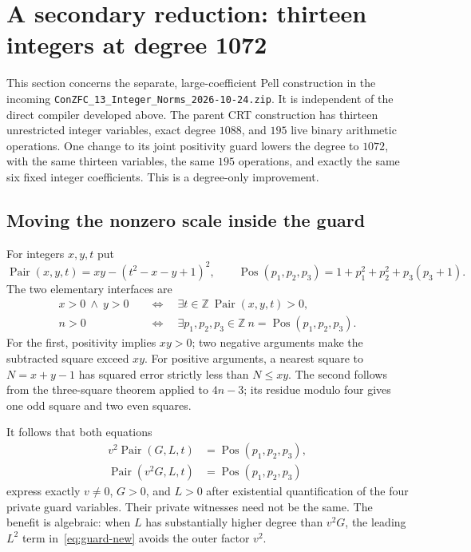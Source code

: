\section{A secondary reduction: thirteen integers at degree 1072}
\label{sec:guard-supplement}

This section concerns the separate, large-coefficient Pell construction in
the incoming \texttt{ConZFC\_13\_Integer\_Norms\_2026-10-24.zip}.
It is independent of the direct compiler developed above.
The parent CRT construction has thirteen unrestricted integer variables,
exact degree $1088$, and $195$ live binary arithmetic operations.
One change to its joint positivity guard lowers the degree to $1072$,
with the same thirteen variables, the same $195$ operations, and exactly
the same six fixed integer coefficients. This is a degree-only improvement.

\subsection{Moving the nonzero scale inside the guard}

For integers $x,y,t$ put
\[
 \operatorname{Pair}(x,y,t)=xy-(t^2-x-y+1)^2,
 \qquad
 \operatorname{Pos}(p_1,p_2,p_3)
 =1+p_1^2+p_2^2+p_3(p_3+1).
\]
The two elementary interfaces are
\begin{align*}
 x>0\ \land\ y>0
 &\quad\Longleftrightarrow\quad
 \exists t\in\mathbb Z\ \operatorname{Pair}(x,y,t)>0,\\
 n>0
 &\quad\Longleftrightarrow\quad
 \exists p_1,p_2,p_3\in\mathbb Z\
 n=\operatorname{Pos}(p_1,p_2,p_3).
\end{align*}
For the first, positivity implies $xy>0$; two negative arguments make the
subtracted square exceed $xy$. For positive arguments, a nearest square
to $N=x+y-1$ has squared error strictly less than $N\le xy$.
The second follows from the three-square theorem applied to $4n-3$;
its residue modulo four gives one odd square and two even squares.

It follows that both equations
\begin{align}
 v^2\operatorname{Pair}(G,L,t)
   &=\operatorname{Pos}(p_1,p_2,p_3),\label{eq:guard-old}\\
 \operatorname{Pair}(v^2G,L,t)
   &=\operatorname{Pos}(p_1,p_2,p_3)\label{eq:guard-new}
\end{align}
express exactly $v\ne0$, $G>0$, and $L>0$ after existential
quantification of the four private guard variables. Their private
witnesses need not be the same. The benefit is algebraic: when $L$
has substantially higher degree than $v^2G$, the leading $L^2$ term
in~\eqref{eq:guard-new} avoids the outer factor $v^2$.

